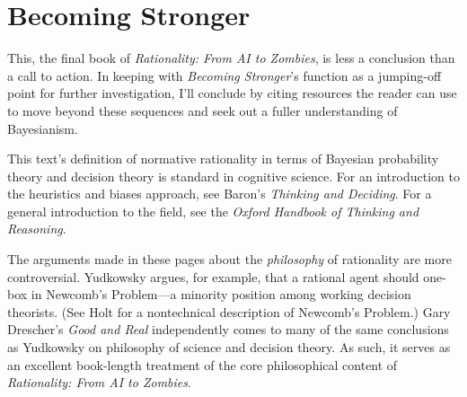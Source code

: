 \part{Becoming Stronger}



{
 This, the final book of \textit{Rationality: From AI to Zombies},
is less a conclusion than a call to action. In keeping with
\textit{Becoming Stronger}'s function as a jumping-off
point for further investigation, I'll conclude by
citing resources the reader can use to move beyond these sequences and
seek out a fuller understanding of Bayesianism.}

{
 This text's definition of normative rationality in
terms of Bayesian probability theory and decision theory is standard in
cognitive science. For an introduction to the heuristics and biases
approach, see Baron's \textit{Thinking and
Deciding}. For a general introduction to the field,
see the \textit{Oxford Handbook of Thinking and
Reasoning}.}

{
 The arguments made in these pages about the \textit{philosophy} of
rationality are more controversial. Yudkowsky argues, for example, that
a rational agent should one-box in Newcomb's
Problem---a minority position among working decision
theorists. (See Holt for a nontechnical description
of Newcomb's Problem.) Gary
Drescher's \textit{Good and Real} independently comes
to many of the same conclusions as Yudkowsky on philosophy of science
and decision theory. As such, it serves as an
excellent book-length treatment of the core philosophical content of
\textit{Rationality: From AI to Zombies}.}

